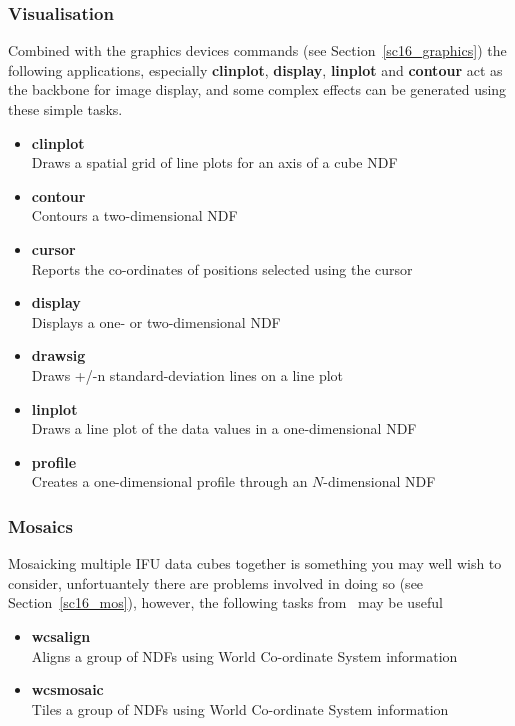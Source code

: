 \documentclass[twoside,11pt]{article}
\newcommand{\htmlref}[2]{#1}
\newcommand{\xref}[3]{#1}
\newcommand{\latex}[1]{#1}
\begin{document}
{\subsubsection{Visualisation}

Combined with the \htmlref{graphics devices commands}{sc16_graphics}\latex{ (see
Section~\ref{sc16_graphics})} the following applications, especially
{\bf clinplot}, {\bf display}, {\bf linplot} and {\bf contour} act as the backbone
for image display, and some complex effects can be generated using
these simple tasks.

\begin{itemize}
\item{\xref{{\bf clinplot}}{sun95}{CLINPLOT}}\\
Draws a spatial grid of line plots for an axis of a cube NDF  
\item{\xref{{\bf contour}}{sun95}{CONTOUR}}\\
Contours a two-dimensional NDF 
\item{\xref{{\bf cursor}}{sun95}{CURSOR}}\\
Reports the co-ordinates of positions selected using the cursor 
\item{\xref{{\bf display}}{sun95}{DISPLAY}}\\
Displays a one- or two-dimensional NDF 
\item{\xref{{\bf drawsig}}{sun95}{DRAWSIG}}\\
Draws +/-n standard-deviation lines on a line plot 
\item{\xref{{\bf linplot}}{sun95}{LINPLOT}}\\
Draws a line plot of the data values in a one-dimensional NDF 
\item{\xref{{\bf profile}}{sun95}{PROFILE}}\\
Creates a one-dimensional profile through an $N$-dimensional NDF 
\end{itemize}  

\subsubsection{Mosaics}

Mosaicking multiple IFU data cubes together is something you may well
wish to consider, unfortuantely there are \htmlref{problems}{sc16_mos}
involved in doing so\latex{ (see Section~\ref{sc16_mos})}, however,
the following tasks from \KAPPA\ may be useful

\begin{itemize}  
\item{\xref{{\bf wcsalign}}{sun95}{WCSALIGN}}\\
Aligns a group of NDFs using World Co-ordinate System information 
\item{\xref{{\bf wcsmosaic}}{sun95}{WCSMOSAIC}}\\
Tiles a group of NDFs using World Co-ordinate System information
\end{itemize}

}
\end{document}
